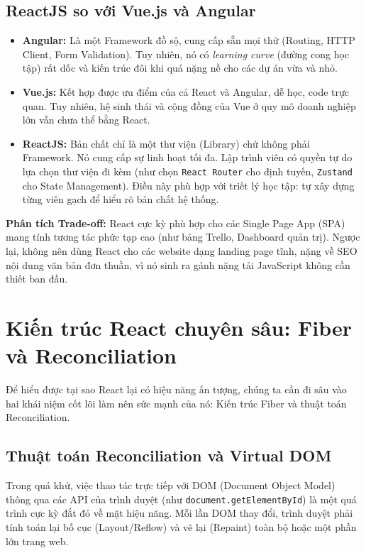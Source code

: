\subsection{ReactJS so với Vue.js và Angular}
\begin{itemize}
    \item \textbf{Angular:} Là một Framework đồ sộ, cung cấp sẵn mọi thứ (Routing, HTTP Client, Form Validation). Tuy nhiên, nó có \textit{learning curve} (đường cong học tập) rất dốc và kiến trúc đôi khi quá nặng nề cho các dự án vừa và nhỏ.
    \item \textbf{Vue.js:} Kết hợp được ưu điểm của cả React và Angular, dễ học, code trực quan. Tuy nhiên, hệ sinh thái và cộng đồng của Vue ở quy mô doanh nghiệp lớn vẫn chưa thể bằng React.
    \item \textbf{ReactJS:} Bản chất chỉ là một thư viện (Library) chứ không phải Framework. Nó cung cấp sự linh hoạt tối đa. Lập trình viên có quyền tự do lựa chọn thư viện đi kèm (như chọn \texttt{React Router} cho định tuyến, \texttt{Zustand} cho State Management). Điều này phù hợp với triết lý học tập: tự xây dựng từng viên gạch để hiểu rõ bản chất hệ thống.
\end{itemize}

\textbf{Phân tích Trade-off:} React cực kỳ phù hợp cho các Single Page App (SPA) mang tính tương tác phức tạp cao (như bảng Trello, Dashboard quản trị). Ngược lại, không nên dùng React cho các website dạng landing page tĩnh, nặng về SEO nội dung văn bản đơn thuần, vì nó sinh ra gánh nặng tải JavaScript không cần thiết ban đầu.

\section{Kiến trúc React chuyên sâu: Fiber và Reconciliation}
Để hiểu được tại sao React lại có hiệu năng ấn tượng, chúng ta cần đi sâu vào hai khái niệm cốt lõi làm nên sức mạnh của nó: Kiến trúc Fiber và thuật toán Reconciliation.

\subsection{Thuật toán Reconciliation và Virtual DOM}
Trong quá khứ, việc thao tác trực tiếp với DOM (Document Object Model) thông qua các API của trình duyệt (như \texttt{document.getElementById}) là một quá trình cực kỳ đắt đỏ về mặt hiệu năng. Mỗi lần DOM thay đổi, trình duyệt phải tính toán lại bố cục (Layout/Reflow) và vẽ lại (Repaint) toàn bộ hoặc một phần lớn trang web.

